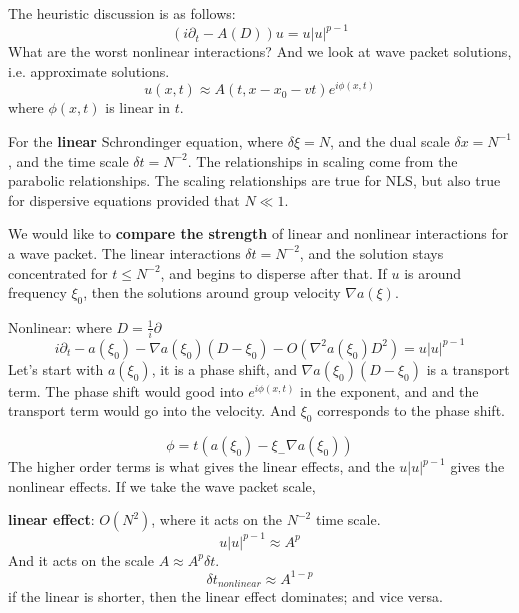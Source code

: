 The heuristic discussion is as follows:
\begin{equation*}
    (i\partial_t-A(D))u=u|u|^{p-1}
\end{equation*}
What are the worst nonlinear interactions? And we look at wave packet solutions, i.e. approximate solutions.
\begin{equation*}
    u(x,t)\approx A(t, x-x_0-vt)e^{i\phi(x,t)}
\end{equation*}
where $\phi(x,t)$ is linear in $t$.

For the \textbf{linear} Schrondinger equation, where $\delta\xi=N$, and the dual scale $\delta x=N^{-1}$, and the time scale $\delta t=N^{-2}$. The relationships in scaling come from the parabolic relationships. The scaling relationships are true for NLS, but also true for dispersive equations provided that $N\ll 1$.

We would like to \textbf{compare the strength} of linear and nonlinear interactions for a wave packet. The linear interactions $\delta t=N^{-2}$, and the solution stays concentrated for $t\leq N^{-2}$, and begins to disperse after that. If $u$ is around frequency $\xi_0$, then the solutions around group velocity $\nabla a(\xi)$.

Nonlinear: where $D=\frac{1}{i}\partial$
\begin{equation*}
    i\partial_t-a(\xi_0)-\nabla a(\xi_0)(D-\xi_0)-O(\nabla^2a(\xi_0)D^2)=u|u|^{p-1}
\end{equation*}
Let's start with $a(\xi_0)$, it is a phase shift, and $\nabla a(\xi_0)(D-\xi_0)$ is a transport term. The phase shift would good into $e^{i\phi(x,t)}$ in the exponent, and and the transport term would go into the velocity. And $\xi_0$ corresponds to the phase shift.

\begin{equation*}
    \phi=t(a(\xi_0)-\xi_-\nabla a(\xi_0))
\end{equation*}
The higher order terms is what gives the linear effects, and the $u|u|^{p-1}$ gives the nonlinear effects. If we take the wave packet scale,

\textbf{linear effect}: $O(N^2)$, where it acts on the $N^{-2}$ time scale. 
\begin{equation*}
    u|u|^{p-1}\approx A^p
\end{equation*}
And it acts on the scale $A\approx A^p\delta t$.
\begin{equation*}
    \delta t_{nonlinear}\approx A^{1-p}
\end{equation*}
if the linear is shorter, then the linear effect dominates; and vice versa.

